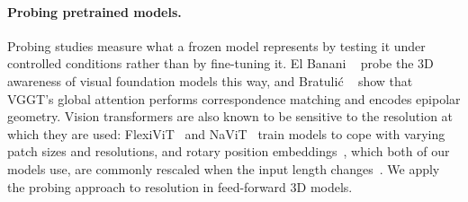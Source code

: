 \paragraph{Probing pretrained models.}
Probing studies measure what a frozen model represents by testing it under controlled conditions rather than by fine-tuning it. El Banani \etal~\cite{elbanani2024probing} probe the 3D awareness of visual foundation models this way, and Bratuli\'c \etal~\cite{bratulic2025geometric} show that VGGT's global attention performs correspondence matching and encodes epipolar geometry. Vision transformers are also known to be sensitive to the resolution at which they are used: FlexiViT~\cite{beyer2023flexivit} and NaViT~\cite{dehghani2023navit} train models to cope with varying patch sizes and resolutions, and rotary position embeddings~\cite{su2024roformer}, which both of our models use, are commonly rescaled when the input length changes~\cite{chen2023pi,peng2023yarn}. We apply the probing approach to resolution in feed-forward 3D models.
